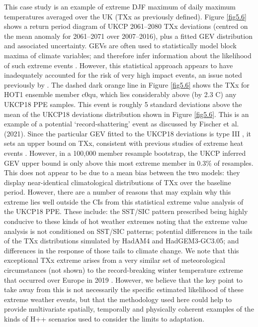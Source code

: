     This case study is an example of extreme DJF maximum of daily maximum temperatures averaged over the UK (TXx as previously defined). Figure \ref{fig5.6} shows a return period diagram of UKCP 2061--2080 TXx deviations (centred on the mean anomaly for 2061--2071 over 2007--2016), plus a fitted GEV distribution and associated uncertainty. GEVs are often used to statistically model block maxima of climate variables; and therefore infer information about the likelihood of such extreme events \citep{brown_climate_2014}. However, this statistical approach appears to have inadequately accounted for the risk of very high impact events, an issue noted previously by \citet{sippel_combining_2015}. The dashed dark orange line in Figure \ref{fig5.6} shows the TXx for HOT1 ensemble member c0qu, which lies considerably above (by 2.3 \textdegree{}C) any UKCP18 PPE samples. This event is roughly 5 standard deviations above the mean of the UKCP18 deviations distribution shown in Figure \ref{fig5.6}. This is an example of a potential `record-shattering' event as discussed by Fischer et al. (2021). Since the particular GEV fitted to the UKCP18 deviations is type III \citep{coles_introduction_2001}, it sets an upper bound on TXx, consistent with previous studies of extreme heat events \citep{gessner_very_2021}. However, in a 100,000 member resample bootstrap, the UKCP inferred GEV upper bound is only above this most extreme member in 0.3\% of resamples. This does not appear to be due to a mean bias between the two models: they display near-identical climatological distributions of TXx over the baseline period. However, there are a number of reasons that may explain why this extreme lies well outside the CIs from this statistical extreme value analysis of the UKCP18 PPE. These include: the SST/SIC pattern prescribed being highly conducive to these kinds of hot weather extremes noting that the extreme value analysis is not conditioned on SST/SIC patterns; potential differences in the tails of the TXx distributions simulated by HadAM4 and HadGEM3-GC3.05; and differences in the response of those tails to climate change. We note that this exceptional TXx extreme arises from a very similar set of meteorological circumstances (not shown) to the record-breaking winter temperature extreme that occurred over Europe in 2019 \citep{kendon_temperature_2020,young_record-breaking_2020}. However, we believe that the key point to take away from this is not necessarily the specific estimated likelihood of these extreme weather events, but that the methodology used here could help to provide multivariate spatially, temporally and physically coherent examples of the kinds of H++ scenarios used to consider the limits to adaptation.

